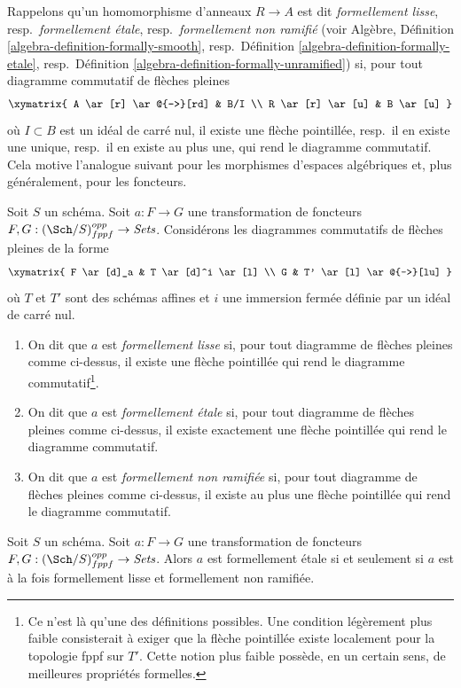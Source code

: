 \noindent
Rappelons qu'un homomorphisme d'anneaux $R \to A$ est dit
{\it formellement lisse}, resp.\ {\it formellement étale},
resp.\ {\it formellement non ramifié}
(voir Algèbre, Définition \ref{algebra-definition-formally-smooth},
resp.\ Définition \ref{algebra-definition-formally-etale},
resp.\ Définition \ref{algebra-definition-formally-unramified})
si, pour tout diagramme commutatif de flèches pleines
$$
\xymatrix{
A \ar[r] \ar@{-->}[rd] & B/I \\
R \ar[r] \ar[u] & B \ar[u]
}
$$
où $I \subset B$ est un idéal de carré nul, il
existe une flèche pointillée, resp.\ il en existe une unique, resp.\ il en existe
au plus une, qui rend le diagramme commutatif. Cela motive
l'analogue suivant pour les morphismes d'espaces algébriques et, plus
généralement, pour les foncteurs.

\begin{definition}
\label{definition-formally-smooth-etale-unramified}
Soit $S$ un schéma.
Soit $a : F \to G$ une transformation de foncteurs
$F, G : (\Sch/S)_{fppf}^{opp} \to \textit{Sets}$.
Considérons les diagrammes commutatifs de flèches pleines de la forme
$$
\xymatrix{
F \ar[d]_a & T \ar[d]^i \ar[l] \\
G & T' \ar[l] \ar@{-->}[lu]
}
$$
où $T$ et $T'$ sont des schémas affines et $i$ une immersion fermée
définie par un idéal de carré nul.
\begin{enumerate}
\item On dit que $a$ est {\it formellement lisse} si, pour tout
diagramme de flèches pleines comme ci-dessus, il existe une flèche pointillée qui rend le diagramme
commutatif\footnote{Ce n'est là qu'une des définitions possibles.
Une condition légèrement plus faible consisterait à exiger que
la flèche pointillée existe localement pour la topologie fppf sur $T'$. Cette notion plus faible
possède, en un certain sens, de meilleures propriétés formelles.}.
\item On dit que $a$ est {\it formellement étale} si, pour tout
diagramme de flèches pleines comme ci-dessus, il existe exactement une flèche pointillée qui rend le diagramme
commutatif.
\item On dit que $a$ est {\it formellement non ramifiée} si, pour tout
diagramme de flèches pleines comme ci-dessus, il existe au plus une flèche pointillée qui rend le diagramme
commutatif.
\end{enumerate}
\end{definition}

\begin{lemma}
\label{lemma-formally-etale-is-combination}
Soit $S$ un schéma.
Soit $a : F \to G$ une transformation de foncteurs
$F, G : (\Sch/S)_{fppf}^{opp} \to \textit{Sets}$.
Alors $a$ est formellement étale si et seulement si $a$ est à la fois formellement
lisse et formellement non ramifiée.
\end{lemma}

